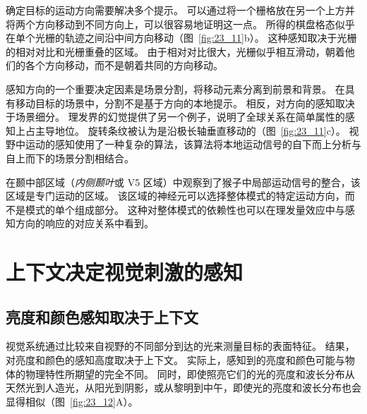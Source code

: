 确定目标的运动方向需要解决多个提示。
可以通过将一个栅格放在另一个上方并将两个方向移动到不同方向上，可以很容易地证明这一点。
所得的棋盘格态似乎在单个光栅的轨迹之间沿中间方向移动（图~\ref{fig:23_11}b）。
这种感知取决于光栅的相对对比和光栅重叠的区域。
由于相对对比很大，光栅似乎相互滑动，朝着他们的各个方向移动，而不是朝着共同的方向移动。


感知方向的一个重要决定因素是场景分割，将移动元素分离到前景和背景。
在具有移动目标的场景中，分割不是基于方向的本地提示。
相反，对方向的感知取决于场景细分。
理发界的幻觉提供了另一个例子，说明了全球关系在简单属性的感知上占主导地位。
旋转条纹被认为是沿极长轴垂直移动的（图~\ref{fig:23_11}c）。
视野中运动的感知使用了一种复杂的算法，该算法将本地运动信号的自下而上分析与自上而下的场景分割相结合。


在颞中部区域（\textit{内侧颞叶}或 V5 区域）中观察到了猴子中局部运动信号的整合，该区域是专门运动的区域。
该区域的神经元可以选择整体模式的特定运动方向，而不是模式的单个组成部分。
这种对整体模式的依赖性也可以在理发量效应中与感知方向的响应的对应关系中看到。



\section{上下文决定视觉刺激的感知}

\subsection{亮度和颜色感知取决于上下文}

视觉系统通过比较来自视野的不同部分到达的光来测量目标的表面特征。
结果，对亮度和颜色的感知高度取决于上下文。
实际上，感知到的亮度和颜色可能与物体的物理特性所期望的完全不同。
同时，即使照亮它们的光的亮度和波长分布从天然光到人造光，从阳光到阴影，或从黎明到中午，即使光的亮度和波长分布也会显得相似（图~\ref{fig:23_12}A）。


